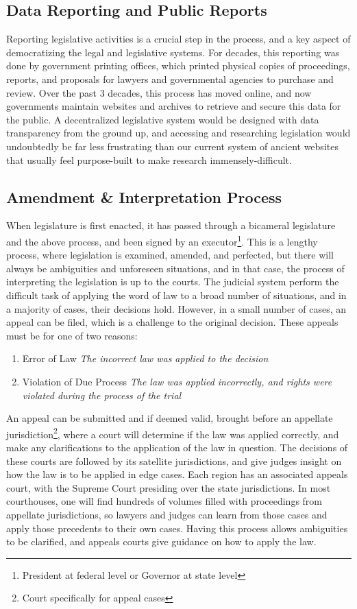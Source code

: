 \documentclass[letterpaper,twocolumn]{article}
\begin{document}
\subsection*{Data Reporting and Public Reports}

Reporting legislative activities is a crucial step in the process, and a key aspect of democratizing the legal and legislative systems.  For decades, this reporting was done by government printing offices, which printed physical copies of proceedings, reports, and proposals for lawyers and governmental agencies to purchase and review.  Over the past 3 decades, this process has moved online, and now governments maintain websites and archives to retrieve and secure this data for the public.  A decentralized legislative system would be designed with data transparency from the ground up, and accessing and researching legislation would undoubtedly be far less frustrating than our current system of ancient websites that usually feel purpose-built to make research immensely-difficult.

\subsection*{Amendment \& Interpretation Process}

When legislature is first enacted, it has passed through a bicameral legislature and the above process, and been signed by an executor\footnote{President at federal level or Governor at state level}.  This is a lengthy process, where legislation is examined, amended, and perfected, but there will always be ambiguities and unforeseen situations, and in that case, the process of interpreting the legislation is up to the courts.  The judicial system perform the difficult task of applying the word of law to a broad number of situations, and in a majority of cases, their decisions hold.  However, in a small number of cases, an appeal can be filed, which is a challenge to the original decision.  These appeals must be for one of two reasons:
\begin{enumerate} [I]
	\item Error of Law \textbullet \textit{The incorrect law was applied to the decision}
	\item Violation of Due Process \textbullet \textit{The law was applied incorrectly, and rights were violated during the process of the trial}
\end{enumerate}  
An appeal can be submitted and if deemed valid, brought before an appellate jurisdiction\footnote{Court specifically for appeal cases}, where a court will determine if the law was applied correctly, and make any clarifications to the application of the law in question.  The decisions of these courts are followed by its satellite jurisdictions, and give judges insight on how the law is to be applied in edge cases.  Each region has an associated appeals court, with the Supreme Court presiding over the state jurisdictions.  In most courthouses, one will find hundreds of volumes filled with proceedings from appellate jurisdictions, so lawyers and judges can learn from those cases and apply those precedents to their own cases.  Having this process allows ambiguities to be clarified, and appeals courts give guidance on how to apply the law.  
\end{document}
